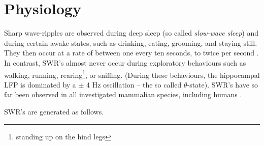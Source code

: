 \section{Physiology}
\label{sec:physiology}

Sharp wave-ripples are observed during deep sleep (so called \emph{slow-wave sleep}) and during certain awake states, such as drinking, eating, grooming, and staying still. They then occur at a rate of between one every ten seconds, to twice per second \cite{Girardeau2011}. In contrast, SWR's almost never occur during exploratory behaviours such as walking, running, rearing\footnote{standing up on the hind legs}, or sniffing. (During these behaviours, the hippocampal LFP is dominated by a $\pm$ 4 Hz oscillation -- the so called $\theta$-state). SWR's have so far been observed in all investigated mammalian species, including humans \cite{Buzsaki2015}.

SWR's are generated as follows. 
